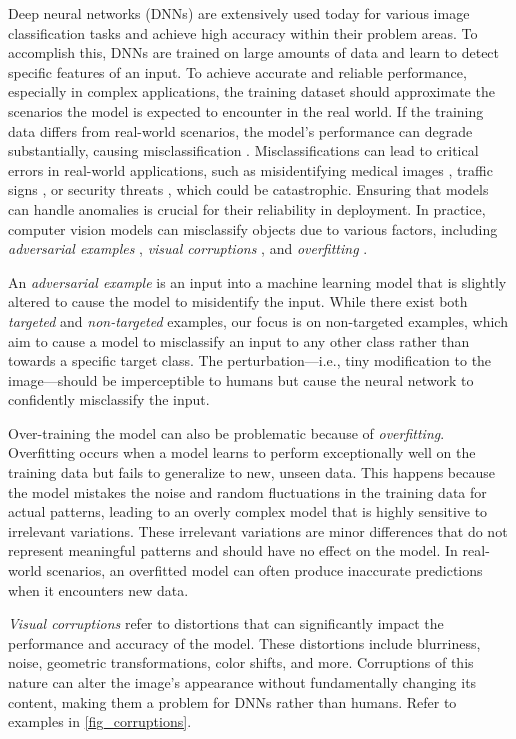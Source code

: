 \documentclass[a4paper]{article}
\begin{document}
Deep neural networks (DNNs) are extensively used today for various image
classification tasks and achieve high accuracy within their problem areas. To
accomplish this, DNNs are trained on large amounts of data and learn to detect
specific features of an input. To achieve accurate and reliable performance,
especially in complex applications, the training dataset should approximate the
scenarios the model is expected to encounter in the real world. If the training
data differs from real-world scenarios, the model’s performance can degrade
substantially, causing misclassification \cite{whang2022baddata}.
Misclassifications can lead to critical errors in real-world applications, such
as misidentifying medical images \cite{tang2020dnninmedicalfield}, traffic
signs \cite{rani2024trafficsigns}, or security threats \cite{Hsiao2019security},
which could be catastrophic. Ensuring that models can handle anomalies is
crucial for their reliability in deployment. In practice, computer vision models
can misclassify objects due to various factors, including
\textit{adversarial examples} \cite{szegedy2014intriguing},
\textit{visual corruptions} \cite{hendrycks2019benchmarking}, and 
\textit{overfitting} \cite{rice2020overfitting}.

An \textit{adversarial example} is an input into a machine learning model that
is slightly altered to cause the model to misidentify the input. While there
exist both \textit{targeted} and \textit{non-targeted} examples, our focus is
on non-targeted examples, which aim to cause a model to misclassify an input to
any other class rather than towards a specific target class. The
perturbation—i.e., tiny modification to the image—should be imperceptible to
humans but cause the neural network to confidently misclassify the input. 

Over-training the model can also be problematic because of \textit{overfitting}. Overfitting occurs when a model learns to perform exceptionally well on the training data but fails to generalize to new, unseen data. This happens because the model mistakes the noise and random fluctuations in the training data for actual patterns, leading to an overly complex model that is highly sensitive to irrelevant variations. These irrelevant variations are minor differences that do not represent meaningful patterns and should have no effect on the model. In real-world scenarios, an overfitted model can often produce inaccurate predictions when it encounters new data. 


\textit{Visual corruptions} refer to distortions that can significantly impact the performance and accuracy of the model. These distortions include blurriness, noise, geometric transformations, color shifts, and more. Corruptions of this nature can alter the image's appearance without fundamentally changing its content, making them a problem for DNNs rather than humans. Refer to examples in \autoref{fig_corruptions}. 
\end{document}
